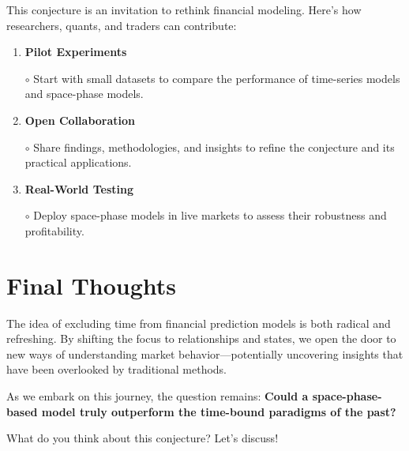 \documentclass{article}
\newcommand{\bn}{\bigskip\noindent}
\begin{document}
\bn
This conjecture is an invitation to rethink financial modeling. Here's how researchers, quants, and traders can contribute:

\begin{enumerate}[1.]
\item   {\bf Pilot Experiments}

    $\circ$   Start with small datasets to compare the performance of time-series models and space-phase models.

\item {\bf Open Collaboration}

    $\circ$   Share findings, methodologies, and insights to refine the conjecture and its practical applications.

\item  {\bf Real-World Testing}

    $\circ$   Deploy space-phase models in live markets to assess their robustness and profitability.
\end{enumerate}


\section*{Final Thoughts}

The idea of excluding time from financial prediction models is both radical and refreshing. By shifting the focus to relationships and states, we open the door to new ways of understanding market behavior---potentially uncovering insights that have been overlooked by traditional methods.

\bn
As we embark on this journey, the question remains: {\bf Could a space-phase-based model truly outperform the time-bound paradigms of the past?}


\bn
What do you think about this conjecture? Let's discuss!
\end{document}
